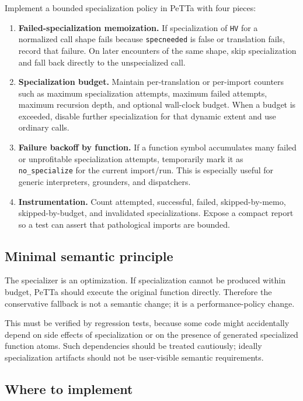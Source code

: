 \documentclass[11pt]{article}
\begin{document}
Implement a bounded specialization policy in PeTTa with four pieces:

\begin{enumerate}[label=\textbf{F\arabic*.},leftmargin=2.4em]
\item \textbf{Failed-specialization memoization.} If specialization of \texttt{HV} for a normalized call shape fails because \texttt{specneeded} is false or translation fails, record that failure. On later encounters of the same shape, skip specialization and fall back directly to the unspecialized call.

\item \textbf{Specialization budget.} Maintain per-translation or per-import counters such as maximum specialization attempts, maximum failed attempts, maximum recursion depth, and optional wall-clock budget. When a budget is exceeded, disable further specialization for that dynamic extent and use ordinary calls.

\item \textbf{Failure backoff by function.} If a function symbol accumulates many failed or unprofitable specialization attempts, temporarily mark it as \texttt{no\_specialize} for the current import/run. This is especially useful for generic interpreters, grounders, and dispatchers.

\item \textbf{Instrumentation.} Count attempted, successful, failed, skipped-by-memo, skipped-by-budget, and invalidated specializations. Expose a compact report so a test can assert that pathological imports are bounded.
\end{enumerate}

\subsection{Minimal semantic principle}

The specializer is an optimization. If specialization cannot be produced within budget, PeTTa should execute the original function directly. Therefore the conservative fallback is not a semantic change; it is a performance-policy change.

This must be verified by regression tests, because some code might accidentally depend on side effects of specialization or on the presence of generated specialized function atoms. Such dependencies should be treated cautiously; ideally specialization artifacts should not be user-visible semantic requirements.

\subsection{Where to implement}
\end{document}
